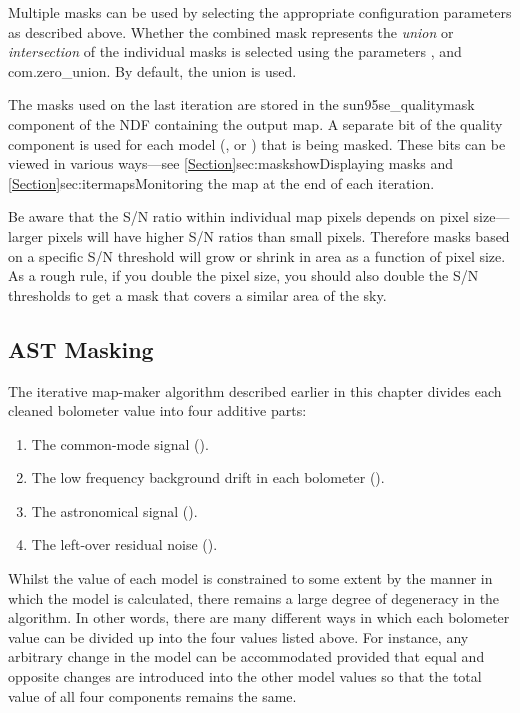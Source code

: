 Multiple masks can be used by selecting the appropriate configuration
parameters as described above. Whether the combined mask represents the
\emph{union} or \emph{intersection} of the individual masks is selected
using the parameters ,
 and 
{com.zero\_union}. By default, the union is used.



The masks used on the last iteration are stored in the 
{sun95}{se_qualitymask} component of the NDF containing the output map.
A separate bit of the quality component is used for each model (,
 or ) that is being masked. These bits can be
viewed in various ways---see \cref{Section}{sec:maskshow}{Displaying masks}
and \cref{Section}{sec:itermaps}{Monitoring the map at the end of each
iteration}.

\begin{tip}
Be aware that the S/N ratio within individual map pixels depends on pixel
size---larger pixels will have higher S/N ratios than small pixels.
Therefore masks based on a specific S/N threshold will grow or shrink in
area as a function of pixel size. As a rough rule, if you double the pixel
size, you should also double the S/N thresholds to get a mask that covers a
similar area of the sky.
\end{tip}

\subsection{AST Masking}
\label{sec:astmask}
The iterative map-maker algorithm described earlier in this chapter
divides each cleaned bolometer value into four additive parts:
\begin{enumerate}
\item The common-mode signal ().
\item The low frequency background drift in each bolometer ().
\item The astronomical signal ().
\item The left-over residual noise ().
\end{enumerate}

Whilst the value of each model is constrained to some extent by the
manner in which the model is calculated, there remains a large degree of
degeneracy in the algorithm. In other words, there are many different
ways in which each bolometer value can be divided up into the four values
listed above. For instance, any arbitrary change in the  model
can be accommodated provided that equal and opposite changes are introduced
into the other model values so that the total value of all four components
remains the same.

